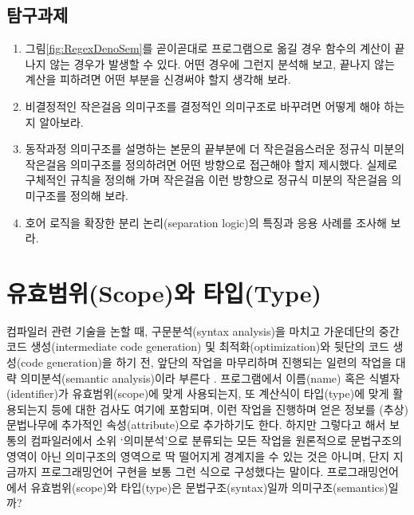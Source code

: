 \section*{탐구과제}
\begin{enumerate}
 \item 그림\;\ref{fig:RegexDenoSem}를 곧이곧대로 프로그램으로 옮길 경우
       함수의 계산이 끝나지 않는 경우가 발생할 수 있다.
       어떤 경우에 그런지 분석해 보고, 끝나지 않는 계산을 피하려면
       어떤 부분을 신경써야 할지 생각해 보라.
 \item 비결정적인 작은걸음 의미구조를 결정적인 의미구조로 바꾸려면
       어떻게 해야 하는지 알아보라.
 \item 동작과정 의미구조를 설명하는 본문의 끝부분에 더 작은걸음스러운
       정규식 미분의 작은걸음 의미구조를 정의하려면 어떤 방향으로 접근해야
       할지 제시했다. 실제로 구체적인 규칙을 정의해 가며 작은걸음 이런
       방향으로 정규식 미분의 작은걸음 의미구조를 정의해 보라.
 \item 호어 로직을 확장한 분리 논리(separation logic)의 특징과 응용 사례를 조사해 보라.
\end{enumerate}

\chapter{유효범위(Scope)와 타입(Type)}
컴파일러 관련 기술을 논할 때, 구문분석(syntax analysis)을 마치고
가운데단의 중간 코드 생성(intermediate code generation) 및
최적화(optimization)와 뒷단의 코드 생성(code generation)을 하기 전,
앞단의 작업을 마무리하며 진행되는 일련의 작업을 대략
의미분석(semantic analysis)이라 부른다 \cite{Aho2013compilers2nd}.
프로그램에서 이름(name) 혹은 식별자(identifier)가 유효범위(scope)에
맞게 사용되는지, 또 계산식이 타입(type)에 맞게 활용되는지 등에 대한
검사도 여기에 포함되며, 이런 작업을 진행하며 얻은 정보를 (추상)문법나무에
추가적인 속성(attribute)으로 추가하기도 한다. 하지만 그렇다고 해서
보통의 컴파일러에서 소위 `의미분석'으로 분류되는 모든 작업을 원론적으로
문법구조의 영역이 아닌 의미구조의 영역으로 딱 떨어지게 경계지을 수 있는
것은 아니며, 단지 지금까지 프로그래밍언어 구현을 보통 그런 식으로
구성했다는 말이다. 프로그래밍언어에서 유효범위(scope)와 타입(type)은
문법구조(syntax)일까 의미구조(semantics)일까?

\newpage

